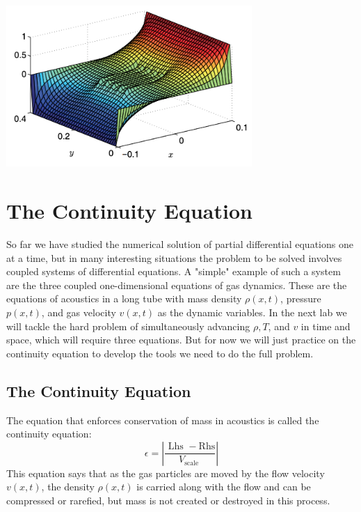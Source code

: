 \documentclass{book}
\theoremstyle{plain}
\theoremstyle{definition}
\numberwithin{exm}{chapter}
\theoremstyle{remark}
\theoremstyle{summary}
\theoremstyle{overview}
\begin{document}
\begin{enumerate}[label=(\alph*)]
\includegraphics[width=0.7\textwidth]{fig94}
\end{enumerate}


\chapter*{The Continuity Equation}
So far we have studied the numerical solution of partial differential equations one at a time, but in many interesting situations the problem to be solved involves coupled systems of differential equations. A "simple" example of such a system are the three coupled one-dimensional equations of gas dynamics. These are the equations of acoustics in a long tube with mass density $\rho(x, t)$, pressure $p(x, t)$, and gas velocity $v(x, t)$ as the dynamic variables. In the next lab we will tackle the hard problem of simultaneously advancing $\rho, T$, and $v$ in time and space, which will require three equations. But for now we will just practice on the continuity equation to develop the tools we need to do the full problem.
\section*{The Continuity Equation}
The equation that enforces conservation of mass in acoustics is called the continuity equation:
\begin{equation}\label{eq:101}
\epsilon=\left|\frac{\text { Lhs }-\mathrm{Rhs}}{V_{\text {scale }}}\right|
\end{equation}
This equation says that as the gas particles are moved by the flow velocity $v(x, t)$, the density $\rho(x, t)$ is carried along with the flow and can be compressed or rarefied, but mass is not created or destroyed in this process.
\end{document}

